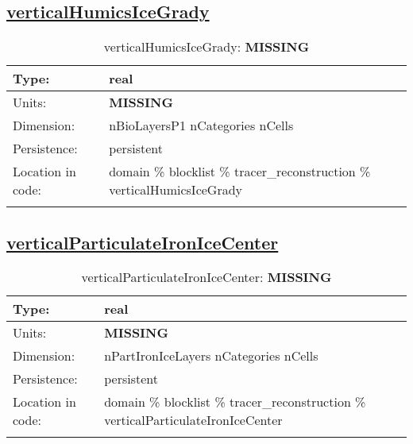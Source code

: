 \subsection[verticalHumicsIceGrady]{\hyperref[sec:var_tab_tracer_reconstruction]{verticalHumicsIceGrady}}
\label{subsec:var_sec_tracer_reconstruction_verticalHumicsIceGrady}
\begin{center}
\begin{longtable}{| p{2.0in} | p{4.0in} |}
        \hline 
        Type: & real \\
        \hline 
        Units: & {\bf \color{red} MISSING} \\
        \hline 
        Dimension: & nBioLayersP1 nCategories nCells \\
        \hline 
        Persistence: & persistent \\
        \hline 
         Location in code: & domain \% blocklist \% tracer\_reconstruction \% verticalHumicsIceGrady \\
         \hline 
    \caption{verticalHumicsIceGrady: {\bf \color{red} MISSING}}
\end{longtable}
\end{center}
\subsection[verticalParticulateIronIceCenter]{\hyperref[sec:var_tab_tracer_reconstruction]{verticalParticulateIronIceCenter}}
\label{subsec:var_sec_tracer_reconstruction_verticalParticulateIronIceCenter}
\begin{center}
\begin{longtable}{| p{2.0in} | p{4.0in} |}
        \hline 
        Type: & real \\
        \hline 
        Units: & {\bf \color{red} MISSING} \\
        \hline 
        Dimension: & nPartIronIceLayers nCategories nCells \\
        \hline 
        Persistence: & persistent \\
        \hline 
         Location in code: & domain \% blocklist \% tracer\_reconstruction \% verticalParticulateIronIceCenter \\
         \hline 
    \caption{verticalParticulateIronIceCenter: {\bf \color{red} MISSING}}
\end{longtable}
\end{center}
